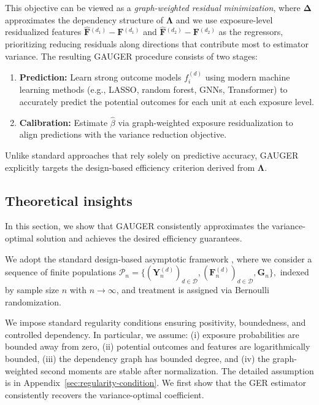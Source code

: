 \documentclass{article}
\theoremstyle{plain}
\theoremstyle{definition}
\theoremstyle{remark}
\newcommand{\bY}{\boldsymbol{Y}}
\newcommand{\bG}{\boldsymbol{G}}
\newcommand{\bF}{\boldsymbol{F}}
\newcommand{\bLambda}{\boldsymbol{\Lambda}}
\newcommand{\bDelta}{\boldsymbol{\Delta}}
\newcommand{\cD}{\mathcal{D}}
\begin{document}
This objective can be viewed as a \emph{graph-weighted residual minimization}, where $\bDelta$ approximates the dependency structure of $\bLambda$ and we use exposure-level residualized features $\hat{\bF}{}^{(d_1)} - \bF{}^{(d_1)} $ and $\hat{\bF}{}^{(d_2)} - \bF{}^{(d_2)} $ as the regressors, prioritizing reducing residuals along directions that contribute most to estimator variance. The resulting GAUGER procedure consists of two stages:

\begin{enumerate}[label=(S\arabic*)]
\item \textbf{Prediction:} Learn strong outcome models $f_i^{(d)}$ using modern machine learning methods (e.g., LASSO, random forest, GNNs, Transformer) to accurately predict the
potential outcomes for each unit at each exposure level.
\item \textbf{Calibration:} Estimate $\hat{\beta}$ via graph-weighted exposure residualization to align predictions with the variance reduction objective.
\end{enumerate}

Unlike standard approaches that rely solely on predictive accuracy, GAUGER explicitly targets the design-based efficiency criterion derived from $\bLambda$.

\subsection{Theoretical insights}
In this section, we show  that GAUGER consistently approximates the variance-optimal solution and achieves the desired efficiency guarantees.

We adopt the standard design-based asymptotic framework \citep{ding2024first, aronow2017estimating}, where we consider a sequence of finite populations 
$
\mathcal{P}_n = \{(\bY_n^{(d)})_{d\in\cD}, (\bF_n^{(d)})_{d\in\cD}, \bG_n\},
$ indexed by sample size $n$ with $n \to \infty$, and treatment is assigned via Bernoulli randomization. 





We impose standard regularity conditions ensuring positivity, boundedness, and controlled dependency. In particular, we assume:
(i) exposure probabilities are bounded away from zero,
(ii) potential outcomes and features are logarithmically bounded,
(iii) the dependency graph has bounded degree, and
(iv) the graph-weighted second moments are stable after normalization.  The detailed assumption is in Appendix~\ref{sec:regularity-condition}. We first show that the GER estimator consistently recovers the variance-optimal coefficient.
\end{document}
